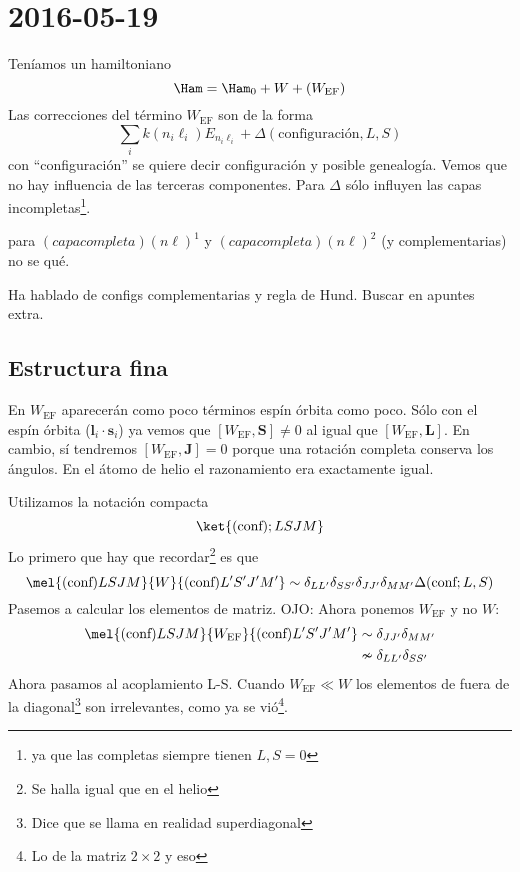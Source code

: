 \section{2016-05-19}
Teníamos un hamiltoniano
\begin{equation}
  \Ham = \Ham_0 + W + (W_\text{EF})
\end{equation}
Las correcciones del término $W_\text{EF}$ son de la forma
\begin{equation}
  \sum_{i} k(n_i \ell_i) E_{n_i \ell_i} + \Delta(\text{configuración},L,S)
\end{equation}
con ``configuración'' se quiere decir configuración y posible
genealogía. Vemos que no hay influencia de las terceras componentes.
Para $\Delta$ sólo influyen las capas incompletas\footnote{ya que las
completas siempre tienen $L,S=0$}.

para $(capa completa)(n\ell)^1$ y $(capa completa)(n\ell)^2$ (y
complementarias) no se qué.

Ha hablado de configs complementarias y regla de Hund. Buscar en
apuntes extra.

\subsection{Estructura fina}
En $W_\text{EF}$ aparecerán como poco términos espín órbita como poco.
Sólo con el espín órbita ($\mathbf{l}_i\cdot \mathbf{s}_i$) ya vemos
que $[W_\text{EF},\mathbf{S}]\neq 0$ al igual que
$[W_\text{EF},\mathbf{L}]$. En cambio, sí tendremos
$[W_\text{EF},\mathbf{J}]=0$ porque una rotación completa conserva los
ángulos. En el átomo de helio el razonamiento era exactamente igual.

Utilizamos la notación compacta
\begin{equation}
  \ket{ (\text{conf}) ; L S J M}
\end{equation}
Lo primero que hay que recordar\footnote{Se halla igual que en el helio} es que
\begin{equation}
  \mel{(\text{conf})LSJM}{W}{(\text{conf})L'S'J'M'} \sim
  \delta_{LL'}\delta_{SS'}\delta_{JJ'}\delta_{MM'} \Delta(\text{conf};L,S)
\end{equation}
Pasemos a calcular los elementos de matriz. OJO: Ahora ponemos
$W_\text{EF}$ y no $W$:
\begin{equation}
  \begin{split}
    \mel{(\text{conf})LSJM}{W_\text{EF}}{(\text{conf})L'S'J'M'} & \sim
    \delta_{JJ'} \delta_{MM'} \\
    & \nsim \delta_{LL'}\delta_{SS'}
  \end{split}
\end{equation}
Ahora pasamos al acoplamiento L-S. Cuando $W_\text{EF}\ll
W$ los elementos de fuera de la diagonal\footnote{Dice que se llama en
realidad superdiagonal} son irrelevantes, como
ya se vió\footnote{Lo de la matriz $2\times2$ y eso}.

